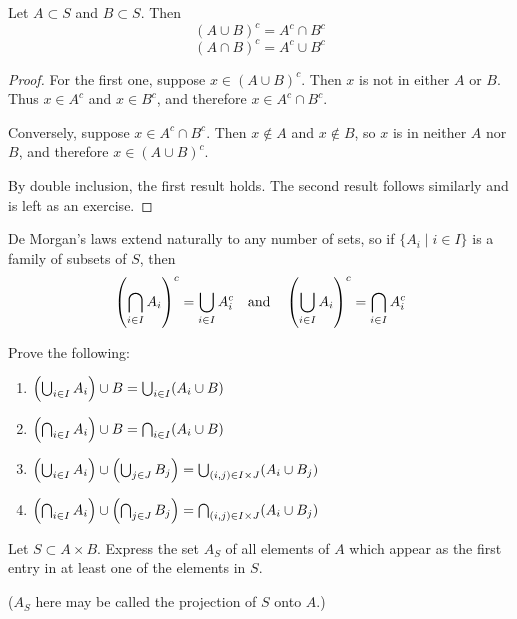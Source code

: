 \begin{proposition}
Let $A \subset S$ and $B \subset S$. Then
\begin{equation}
(A \cup B)^c = A^c \cap B^c
\end{equation}
\begin{equation}
(A \cap B)^c = A^c \cup B^c
\end{equation}
\end{proposition}
\begin{proof}
For the first one, suppose $x \in (A \cup B)^c$. Then $x$ is not in either $A$ or $B$. Thus $x \in A^c$ and $x \in B^c$, and therefore $x \in A^c \cap B^c$. 

Conversely, suppose $x \in A^c \cap B^c$. Then $x \notin A$ and $x \notin B$, so $x$ is in neither $A$ nor $B$, and therefore $x \in (A \cup B)^c$.

By double inclusion, the first result holds. The second result follows similarly and is left as an exercise.
\end{proof}

De Morgan’s laws extend naturally to any number of sets, so if $\{A_i \mid i \in I\}$ is a family of subsets of $S$, then
\[ \left(\bigcap_{i\in I}A_i\right)^c = \bigcup_{i\in I}A_i^c \quad \text{and} \quad \left(\bigcup_{i\in I}A_i\right)^c = \bigcap_{i\in I}A_i^c \]

\begin{exercise}{}{}
Prove the following:
\begin{enumerate}
\item $\left(\bigcup_{i\in I}A_i\right)\cup B=\bigcup_{i\in I}(A_i\cup B)$
\item $\left(\bigcap_{i\in I}A_i\right)\cup B=\bigcap_{i\in I}(A_i\cup B)$
\item $\left(\bigcup_{i\in I}A_i\right)\cup\left(\bigcup_{j\in J}B_j\right)=\bigcup_{(i,j)\in I\times J}(A_i\cup B_j)$
\item $\left(\bigcap_{i\in I}A_i\right)\cup\left(\bigcap_{j\in J}B_j\right)=\bigcap_{(i,j)\in I\times J}(A_i\cup B_j)$
\end{enumerate}
\end{exercise}

\begin{exercise}{}{}
Let $S\subset A\times B$. Express the set $A_S$ of all elements of $A$ which appear as the first entry in at least one of the elements in $S$.

($A_S$ here may be called the projection of $S$ onto $A$.)
\end{exercise}
\pagebreak

